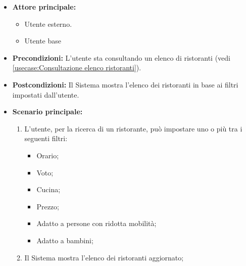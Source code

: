 \label{usecase:Filtra ristoranti}
\begin{itemize}
	\item \textbf{Attore principale:}
    \begin{itemize}
        \item Utente esterno.
        \item Utente base
    \end{itemize}
	
	\item \textbf{Precondizioni:} L'utente sta consultando un elenco di ristoranti (vedi \autoref{usecase:Consultazione elenco ristoranti}).

	\item \textbf{Postcondizioni:} Il Sistema mostra l'elenco dei ristoranti in base ai filtri impostati dall'utente.
 
	      
	\item \textbf{Scenario principale:}
	      \begin{enumerate}
		      \item L'utente, per la ricerca di un ristorante, può impostare uno o più tra i seguenti filtri:
		      \begin{itemize}
                \item Orario;
                \item Voto;
                \item Cucina;
                \item Prezzo;
                \item Adatto a persone con ridotta mobilità;
                \item Adatto a bambini;
              \end{itemize}

		      \item Il Sistema mostra l'elenco dei ristoranti aggiornato;
	      \end{enumerate}

\end{itemize}